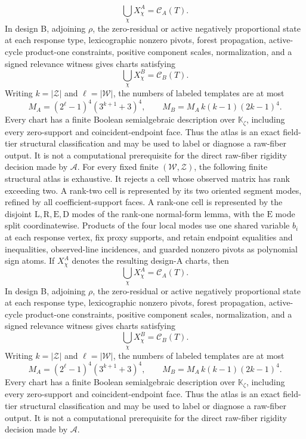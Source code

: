 \[
\bigcup_\chi X^A_\chi=\mathcal C_A(T).
\]
In design B, adjoining \(\rho\), the zero-residual or active negatively proportional state at each response type, lexicographic nonzero pivots, forest propagation, active-cycle product-one constraints, positive component scales, normalization, and a signed relevance witness gives charts satisfying
\[
\bigcup_\chi X^B_\chi=\mathcal C_B(T).
\]
Writing \(k=|\mathcal Z|\) and \(\ell=|\mathcal W|\), the numbers of labeled templates are at most
\[
M_A=(2^{\ell}-1)^4(3^{k+1}+3)^4,
\qquad
M_B=M_A\,k(k-1)(2k-1)^4.
\]
Every chart has a finite Boolean semialgebraic description over \(\mathbb K_{\zeta}\), including every zero-support and coincident-endpoint face.  Thus the atlas is an exact field-tier structural classification and may be used to label or diagnose a raw-fiber output.  It is not a computational prerequisite for the direct raw-fiber rigidity decision made by \(\mathscr A\).
For every fixed finite \((\mathcal W,\mathcal Z)\), the following finite structural atlas is exhaustive.  It rejects a cell whose observed matrix has rank exceeding two.  A rank-two cell is represented by its two oriented segment modes, refined by all coefficient-support faces.  A rank-one cell is represented by the disjoint \(\mathrm L,\mathrm R,\mathrm E,\mathrm D\) modes of the rank-one normal-form lemma, with the \(\mathrm E\) mode split coordinatewise.  Products of the four local modes use one shared variable \(b_i\) at each response vertex, fix proxy supports, and retain endpoint equalities and inequalities, observed-line incidences, and guarded nonzero pivots as polynomial sign atoms.  If \(X^A_\chi\) denotes the resulting design-A charts, then
\[
\bigcup_\chi X^A_\chi=\mathcal C_A(T).
\]
In design B, adjoining \(\rho\), the zero-residual or active negatively proportional state at each response type, lexicographic nonzero pivots, forest propagation, active-cycle product-one constraints, positive component scales, normalization, and a signed relevance witness gives charts satisfying
\[
\bigcup_\chi X^B_\chi=\mathcal C_B(T).
\]
Writing \(k=|\mathcal Z|\) and \(\ell=|\mathcal W|\), the numbers of labeled templates are at most
\[
M_A=(2^{\ell}-1)^4(3^{k+1}+3)^4,
\qquad
M_B=M_A\,k(k-1)(2k-1)^4.
\]
Every chart has a finite Boolean semialgebraic description over \(\mathbb K_{\zeta}\), including every zero-support and coincident-endpoint face.  Thus the atlas is an exact field-tier structural classification and may be used to label or diagnose a raw-fiber output.  It is not a computational prerequisite for the direct raw-fiber rigidity decision made by \(\mathscr A\).
